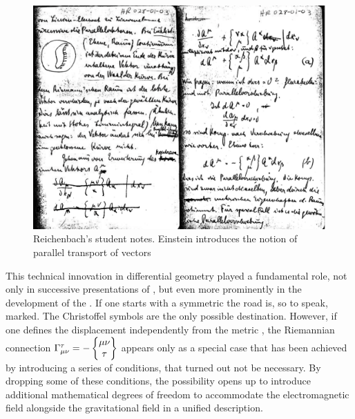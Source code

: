\documentclass[draft]{article}
\begin{document}

\begin{figure}
\begin{center}
 \includegraphics[scale=0.12, trim = 0mm 0mm 0mm 0mm, clip]{parallelverschiebungDOUB.png}
\caption{Reichenbach's student notes. Einstein introduces the notion of parallel transport of vectors}
\label{fig:parallel}
\end{center}
\end{figure}

This technical innovation in differential geometry played a fundamental role, not only in successive presentations of \gr \citep[see][]{Einstein1921}, but even more prominently in the development of the \uftp. If one starts with a symmetric \gmn the road is, so to speak, marked. The Christoffel symbols are the only possible destination. However, if one defines the displacement \Gtmn independently from the metric \gmn, the Riemannian connection $\Gamma^\tau_{\mu\nu} = - \begin{Bmatrix} \mu \nu \\ \tau \end{Bmatrix}$ appears only as a special case that has been achieved by introducing a series of conditions, that turned out not be necessary. By dropping some of these conditions, the possibility opens up to introduce additional mathematical degrees of freedom to accommodate the electromagnetic field alongside the gravitational field in a unified  description.
\end{document}
